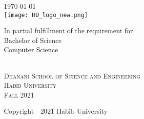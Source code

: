 \begin{titlepage}

{\large \today}\\[1cm] %


\texttt{[image: HU\_logo\_new.png]}\\[0.5cm] %
 
\begin{minipage}{0.8\textwidth}
\begin{center} \large
In partial fulfillment of the requirement for \\
Bachelor of Science \\
Computer Science \\
\end{center}
\end{minipage}\\[1cm]

\textsc{\large Dhanani School of Science and Engineering}\\[0.5cm]
\textsc{\large Habib University}\\[0.5cm] 
\textsc{\large Fall 2021}\\[0.5cm] 

\begin{minipage}{0.8\textwidth}
\begin{center} \large
Copyright~\textcopyright~2021 Habib University
\end{center}
\end{minipage}

\vfill %

\end{titlepage}
